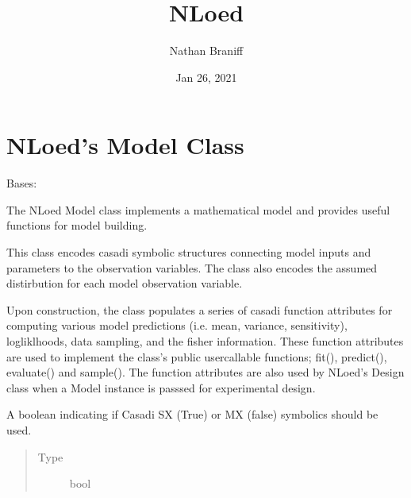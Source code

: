 \documentclass[letterpaper,10pt,english,openany,oneside]{sphinxmanual}
\title{NLoed}
\date{Jan 26, 2021}
\author{Nathan Braniff}
\begin{document}
\pagestyle{empty}
\sphinxmaketitle
\pagestyle{plain}
\sphinxtableofcontents
\pagestyle{normal}
\label{\detokenize{index::doc}}



\chapter{NLoed’s Model Class}
\label{\detokenize{nloed:module-nloed.model}}\label{\detokenize{nloed:nloed-s-model-class}}\label{\detokenize{nloed::doc}}

\begin{fulllineitems}
\label{\detokenize{nloed:nloed.model.Model}}
Bases: 

The NLoed Model class implements a mathematical model and provides useful functions for model building.

This class encodes casadi symbolic structures connecting model inputs and parameters to the
observation variables. The class also encodes the assumed distirbution for each model observation
variable.

Upon construction, the class populates a series of casadi function attributes for
computing various model predictions (i.e. mean, variance, sensitivity), logliklhoods, data
sampling, and the fisher information. These function attributes are used to implement the class’s
public user\sphinxhyphen{}callable functions; fit(), predict(), evaluate() and sample(). The function attributes
are also used by NLoed’s Design class when a Model instance is passsed for experimental design.

\begin{fulllineitems}
\label{\detokenize{nloed:nloed.model.Model.symbolics_boolean}}
A boolean indicating if Casadi SX (True) or MX (false) symbolics
should be used.
\begin{quote}\begin{description}
\item[{Type}] \leavevmode
bool


\end{description}
\end{quote}
\end{fulllineitems}
\end{fulllineitems}
\end{document}
